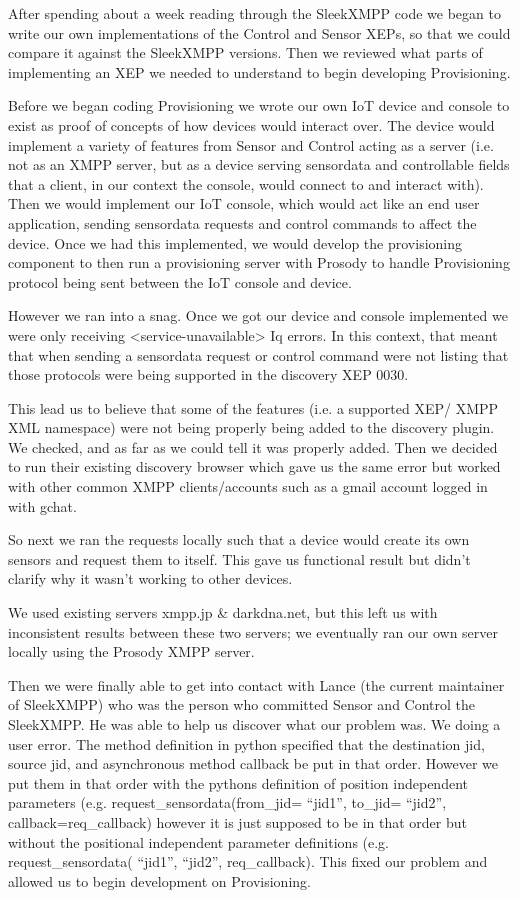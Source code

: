 After spending about a week reading through the SleekXMPP code we began to write
our own implementations of the Control and Sensor XEPs, so that we could compare
it against the SleekXMPP versions. Then we reviewed what parts of implementing
an XEP we needed to understand to begin developing Provisioning.

Before we began coding Provisioning we wrote our own IoT device and console to
exist as proof of concepts of how devices would interact over. The device would
implement a variety of features from Sensor and Control acting as a server (i.e.
not as an XMPP server, but as a device serving sensordata and controllable
fields that a client, in our context the console, would connect to and interact
with). Then we would implement our IoT console, which would act like an end user
application, sending sensordata requests and control commands to affect the
device. Once we had this implemented, we would develop the provisioning
component to then run a provisioning server with Prosody to handle Provisioning
protocol being sent between the IoT console and device.

However we ran into a snag. Once we got our device and console implemented we
were only receiving <service-unavailable> Iq errors. In this context, that meant
that when sending a sensordata request or control command were not listing that
those protocols were being supported in the discovery XEP 0030.

This lead us to believe that some of the features (i.e. a supported XEP/ XMPP
XML namespace)  were not being properly being added to the discovery plugin. We
checked, and as far as we could tell it was properly added. Then we decided to
run their existing discovery browser which gave us the same error but worked
with other common XMPP clients/accounts such as a gmail account logged in with
gchat.

So next we ran the requests locally such that a device would create its own
sensors and request them to itself. This gave us functional result but didn’t
clarify why it wasn’t working to other devices.

We used existing servers xmpp.jp \& darkdna.net, but this left us with
inconsistent results between these two servers; we eventually ran our own server
locally using the Prosody XMPP server.

Then we were finally able to get into contact with Lance (the current maintainer
of SleekXMPP) who was the person who committed Sensor and Control the SleekXMPP.
He was able to help us discover what our problem was. We doing a user error. The
method definition in python specified that the destination jid, source jid, and
asynchronous method callback be put in that order. However we put them in that
order with the pythons definition of position independent parameters (e.g.
request\_sensordata(from\_jid= ``jid1'', to\_jid= ``jid2'',
callback=req\_callback)
however it is just supposed to be in that order but without the positional
independent parameter definitions (e.g. request\_sensordata( ``jid1'',  ``jid2'',
req\_callback). This fixed our problem and allowed us to begin development on
Provisioning.

